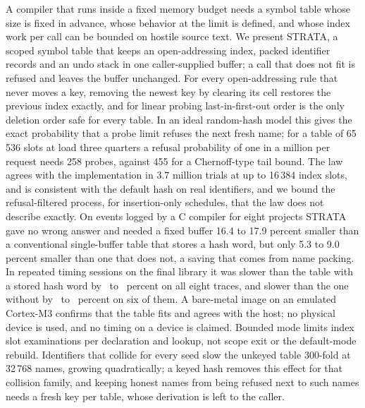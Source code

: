 A compiler that runs inside a fixed memory budget needs a symbol table whose size is fixed in advance, whose behavior at the limit is defined, and whose index work per call can be bounded on hostile source text. We present STRATA, a scoped symbol table that keeps an open-addressing index, packed identifier records and an undo stack in one caller-supplied buffer; a call that does not fit is refused and leaves the buffer unchanged. For every open-addressing rule that never moves a key, removing the newest key by clearing its cell restores the previous index exactly, and for linear probing last-in-first-out order is the only deletion order safe for every table. In an ideal random-hash model this gives the exact probability that a probe limit refuses the next fresh name; for a table of 65\,536 slots at load three quarters a refusal probability of one in a million per request needs 258 probes, against 455 for a Chernoff-type tail bound. The law agrees with the implementation in 3.7 million trials at up to 16\,384 index slots, and is consistent with the default hash on real identifiers, and we bound the refusal-filtered process, for insertion-only schedules, that the law does not describe exactly. On events logged by a C compiler for eight projects STRATA gave no wrong answer and needed a fixed buffer 16.4 to 17.9 percent smaller than a conventional single-buffer table that stores a hash word, but only 5.3 to 9.0 percent smaller than one that does not, a saving that comes from name packing. In repeated timing sessions on the final library it was slower than the table with a stored hash word by \SessSZeroLo\ to \SessSZeroHi\ percent on all eight traces, and slower than the one without by \SessSOneSlowLo\ to \SessSOneSlowHi\ percent on six of them. A bare-metal image on an emulated Cortex-M3 confirms that the table fits and agrees with the host; no physical device is used, and no timing on a device is claimed. Bounded mode limits index slot examinations per declaration and lookup, not scope exit or the default-mode rebuild. Identifiers that collide for every seed slow the unkeyed table 300-fold at 32\,768 names, growing quadratically; a keyed hash removes this effect for that collision family, and keeping honest names from being refused next to such names needs a fresh key per table, whose derivation is left to the caller.
